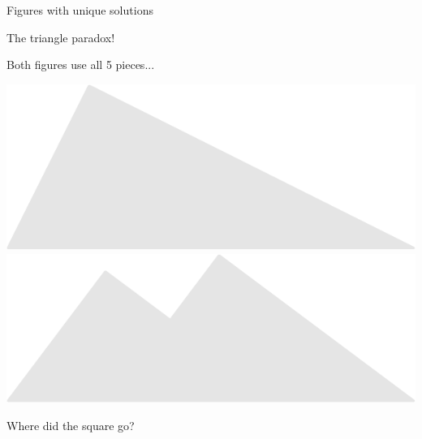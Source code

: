 \documentclass[14pt]{beamer}
\begin{document}
\begin{frame}{Figures with unique solutions}
\begin{center}
            \bigskip\bigskip
        \end{center}
    \end{frame}


    \begin{frame}{The triangle paradox!}
        \begin{center}
            Both figures use all 5 pieces...

            \vspace{50pt}

            \includegraphics[scale=0.45]{figures/figure029l.pdf}\!\!\!
            \includegraphics[scale=0.45]{figures/figure026v.pdf}\;\;

            \vspace{32pt}

            Where did the square go?
        \end{center}
    \end{frame}
\end{document}
